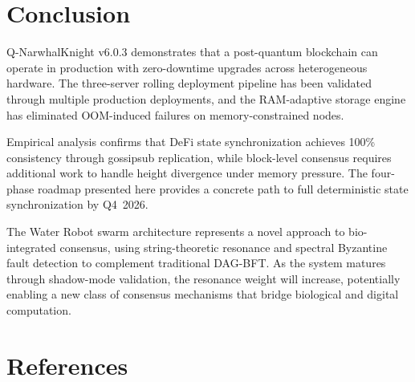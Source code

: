 \documentclass[11pt,a4paper,twocolumn]{article}
\begin{document}
\section{Conclusion}

Q-NarwhalKnight v6.0.3 demonstrates that a post-quantum blockchain can operate
in production with zero-downtime upgrades across heterogeneous hardware. The
three-server rolling deployment pipeline has been validated through multiple
production deployments, and the RAM-adaptive storage engine has eliminated
OOM-induced failures on memory-constrained nodes.

Empirical analysis confirms that DeFi state synchronization achieves 100\%
consistency through gossipsub replication, while block-level consensus
requires additional work to handle height divergence under memory pressure.
The four-phase roadmap presented here provides a concrete path to full
deterministic state synchronization by Q4~2026.

The Water Robot swarm architecture represents a novel approach to bio-integrated
consensus, using string-theoretic resonance and spectral Byzantine fault
detection to complement traditional DAG-BFT. As the system matures through
shadow-mode validation, the resonance weight will increase, potentially
enabling a new class of consensus mechanisms that bridge biological and
digital computation.

\section*{References}
\end{document}
